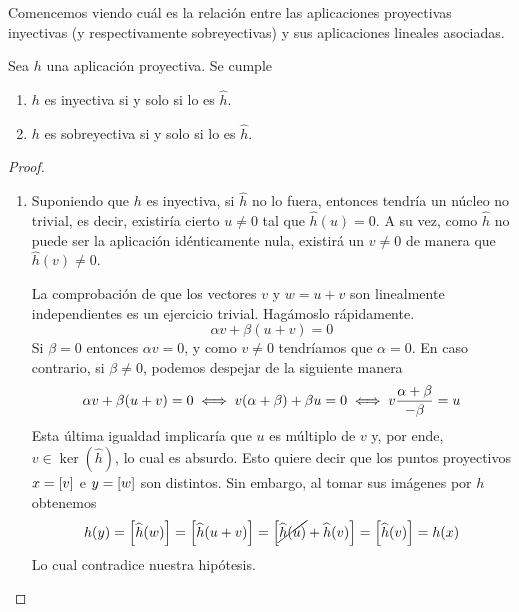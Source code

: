 Comencemos viendo cuál es la relación entre las aplicaciones proyectivas inyectivas (y respectivamente sobreyectivas) y sus aplicaciones lineales asociadas.
\begin{lem}
	\label{apro_lem_inyectividadSobreyectividad}
	Sea $h$ una aplicación proyectiva. Se cumple
	\begin{enumerate}
		\item $h$ es inyectiva si y solo si lo es $\widehat{h}$.
		\item $h$ es sobreyectiva si y solo si lo es $\widehat{h}$.
	\end{enumerate}
\end{lem}
\begin{proof}
	\begin{enumerate}
		\item Suponiendo que $h$ es inyectiva, si $\widehat{h}$ no lo fuera, entonces tendría un núcleo no trivial, es decir, existiría cierto $u\not=0$ tal que $\widehat{h}(u)=0$. A su vez, como $\widehat{h}$ no puede ser la aplicación idénticamente nula, existirá un $v\not=0$ de manera que $\widehat{h}(v)\not=0$.
		
		La comprobación de que los vectores $v$ y $w=u+v$ son linealmente independientes es un ejercicio trivial. Hagámoslo rápidamente.
		\begin{equation*}
			\alpha v + \beta(u+v)=0
		\end{equation*}
		Si $\beta = 0$ entonces $\alpha v = 0$, y como $v\not=0$ tendríamos que $\alpha=0$. En caso contrario, si $\beta\not=0$, podemos despejar de la siguiente manera
		\begin{equation*}\alpha v +\beta(u+v)=0\iff v(\alpha+\beta)+\beta u=0\iff v\frac{\alpha+\beta}{-\beta}=u\end{equation*}
		Esta última igualdad implicaría que $u$ es múltiplo de $v$ y, por ende, $v\in\ker(\widehat{h})$, lo cual es absurdo. Esto quiere decir que los puntos proyectivos $x=\left [ v \right ]$ e $y=\left [ w \right ]$ son distintos. Sin embargo, al tomar sus imágenes por $h$ obtenemos
		\begin{equation*}
			h(y)=\left [ \widehat{h}(w) \right ]=\left [ \widehat{h}(u+v) \right ]=\left [ \cancel{\widehat{h}(u)}+\widehat{h}(v) \right ]=\left [ \widehat{h}(v) \right ]=h(x)
		\end{equation*}
		Lo cual contradice nuestra hipótesis.
		

\end{enumerate}
\end{proof}
